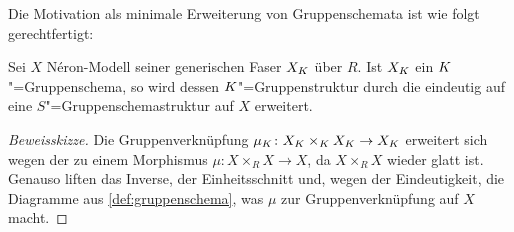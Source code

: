 Die Motivation als minimale Erweiterung von Gruppenschemata ist wie
folgt gerechtfertigt:
\begin{Lemma}\label{thm:gruppenschemaerweiterung}
  Sei $X$ Néron-Modell seiner generischen Faser $X_{K}$ über $R$. Ist
  $X_{K}$ ein $K$"=Gruppenschema, so wird dessen $K$"=Gruppenstruktur
  durch die \NAbbEig eindeutig auf eine $S$"=Gruppenschemastruktur auf
  $X$ erweitert.
  \begin{proof}[Beweisskizze]
    Die Gruppenverknüpfung $\mu_{K}\colon X_{K}\times_{K} X_{K}\to X_{K}$
    erweitert sich wegen der \NAbbEig zu einem Morphismus
    $\mu\colon X\times_R X\to X$, da $X\times_R X$ wieder glatt ist.
    Genauso liften das Inverse, der Einheitsschnitt und, wegen der
    Eindeutigkeit, die Diagramme aus \ref{def:gruppenschema}, was
    $\mu$ zur Gruppenverknüpfung auf $X$ macht.
  \end{proof}
\end{Lemma}

